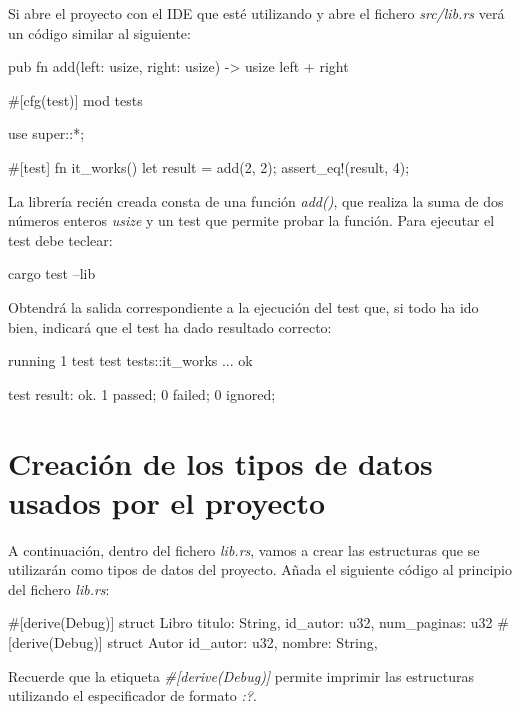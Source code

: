 \documentclass[a4paper,11pt]{extarticle}
\begin{document}
Si abre el proyecto con el IDE que esté utilizando y abre el fichero \textit{src/lib.rs} verá un código similar al siguiente:

\vspace{0.7em}
\begin{Codigo2}
pub fn add(left: usize, right: usize) -> usize {
   left + right
}

#[cfg(test)]
mod tests {
   use super::*;
	
   #[test]
   fn it_works() {
      let result = add(2, 2);
      assert_eq!(result, 4);
   }
}
\end{Codigo2}

La librería recién creada consta de una función \textit{add()}, que realiza la suma de dos números enteros \textit{usize} y un test que permite probar la función. Para ejecutar el test debe teclear:

\vspace{0.7em}
\begin{Codigo2}
cargo test --lib
\end{Codigo2}

Obtendrá la salida correspondiente a la ejecución del test que, si todo ha ido bien, indicará que el test ha dado resultado correcto:

\vspace{0.7em}
\begin{Codigo2}
running 1 test
test tests::it_works ... ok

test result: ok. 1 passed; 0 failed; 0 ignored;
\end{Codigo2}

\section{Creación de los tipos de datos usados por el proyecto}
A continuación, dentro del fichero \textit{lib.rs}, vamos a crear las estructuras que se utilizarán como tipos de datos del proyecto. Añada el siguiente código al principio del fichero \textit{lib.rs}:

\vspace{0.7em}
\begin{Codigo2}
#[derive(Debug)]
struct Libro {
    titulo: String,
    id_autor: u32,
    num_paginas: u32
}
#[derive(Debug)]
struct Autor {
    id_autor: u32,
    nombre: String,
}
\end{Codigo2}

Recuerde que la etiqueta \textit{\#[derive(Debug)]} permite imprimir las estructuras utilizando el especificador de formato \textit{{:?}}.
\end{document}
